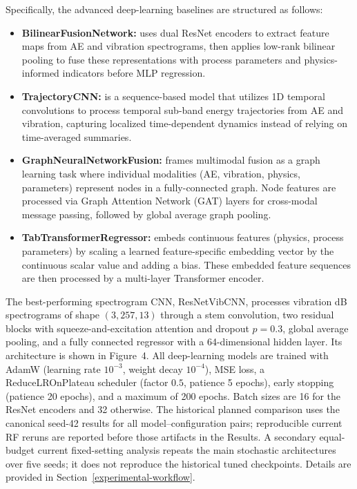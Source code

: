 Specifically, the advanced deep-learning baselines are structured as follows:
\begin{itemize}
\item \textbf{BilinearFusionNetwork:} uses dual ResNet encoders to extract feature maps from AE and vibration spectrograms, then applies low-rank bilinear pooling to fuse these representations with process parameters and physics-informed indicators before MLP regression.
\item \textbf{TrajectoryCNN:} is a sequence-based model that utilizes 1D temporal convolutions to process temporal sub-band energy trajectories from AE and vibration, capturing localized time-dependent dynamics instead of relying on time-averaged summaries.
\item \textbf{GraphNeuralNetworkFusion:} frames multimodal fusion as a graph learning task where individual modalities (AE, vibration, physics, parameters) represent nodes in a fully-connected graph. Node features are processed via Graph Attention Network (GAT) layers for cross-modal message passing, followed by global average graph pooling.
\item \textbf{TabTransformerRegressor:} embeds continuous features (physics, process parameters) by scaling a learned feature-specific embedding vector by the continuous scalar value and adding a bias. These embedded feature sequences are then processed by a multi-layer Transformer encoder.
\end{itemize}

The best-performing spectrogram CNN, ResNetVibCNN, processes vibration
dB spectrograms of shape $(3, 257, 13)$ through a stem convolution,
two residual blocks with squeeze-and-excitation attention and dropout
$p=0.3$, global average pooling, and a fully connected regressor with a
64-dimensional hidden layer. Its architecture is shown in
Figure~4. All deep-learning models are trained
with AdamW (learning rate $10^{-3}$, weight decay $10^{-4}$), MSE loss,
a ReduceLROnPlateau scheduler (factor $0.5$, patience 5 epochs), early
stopping (patience 20 epochs), and a maximum of 200 epochs. Batch sizes
are 16 for the ResNet encoders and 32 otherwise. The historical planned
comparison uses the canonical seed-42 results for all model--configuration
pairs; reproducible current RF reruns are reported before those artifacts in
the Results. A secondary equal-budget current fixed-setting analysis repeats
the main stochastic architectures over five seeds; it does not reproduce the
historical tuned checkpoints. Details are provided in
Section~\ref{experimental-workflow}.

